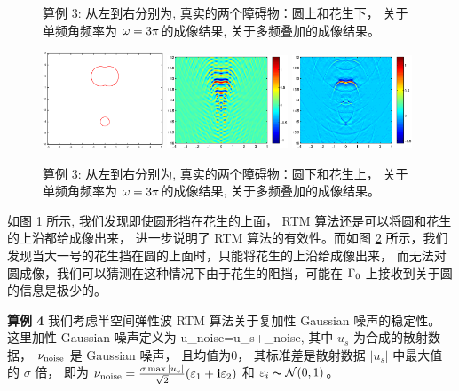 {\begin{figure}[htbp]
	\caption{算例 3: 从左到右分别为,  真实的两个障碍物：圆上和花生下， 关于单频角频率为 $\omega=3\pi$的成像结果, 关于多频叠加的成像结果。}\label{figure_32}
\end{figure}


\begin{figure}[htbp]
 	\centering
 	\includegraphics[width=0.32\textwidth,height=0.16\textheight]{./Img/graphic/circle_0_4_peanut_1_profile_reverse.eps}
 	\includegraphics[width=0.32\textwidth]{./Img/graphic/circle_0_4_peanut_1_3pi_down.eps}
 	\includegraphics[width=0.32\textwidth]{./Img/graphic/circle_0_4_peanut_1_multi_down.eps}
 	
 	\caption{算例 3: 从左到右分别为,  真实的两个障碍物：圆下和花生上， 关于单频角频率为 $\omega=3\pi$的成像结果, 关于多频叠加的成像结果。}\label{figure_33}
 \end{figure}

  如图 \ref{figure_32} 所示, 我们发现即使圆形挡在花生的上面， RTM 算法还是可以将圆和花生的上沿都给成像出来， 进一步说明了 RTM 算法的有效性。而如图 \ref{figure_33} 所示，我们发现当大一号的花生挡在圆的上面时，只能将花生的上沿给成像出来， 而无法对圆成像，我们可以猜测在这种情况下由于花生的阻挡，可能在 $\Gamma_0$ 上接收到关于圆的信息是极少的。
  
\bigskip
\textbf{算例 4}
我们考虑半空间弹性波 RTM 算法关于复加性 Gaussian 噪声的稳定性。 这里加性 Gaussian 噪声定义为 
\ben
u_{\rm noise}=u_s+\nu_{\rm noise},
\een
其中 $u_s$ 为合成的散射数据， $\nu_{\rm noise}$ 是 Gaussian 噪声， 且均值为0， 其标准差是散射数据 $|u_s|$ 中最大值的 $\sigma$ 倍， 即为 $\nu_{\rm noise}=\frac{\sigma \max |u_s|}{\sqrt{2}}(\varepsilon_1+\mathbf{i}\varepsilon_2)$ 和 $\varepsilon_i\thicksim \mathcal{N}(0,1)$。

}
